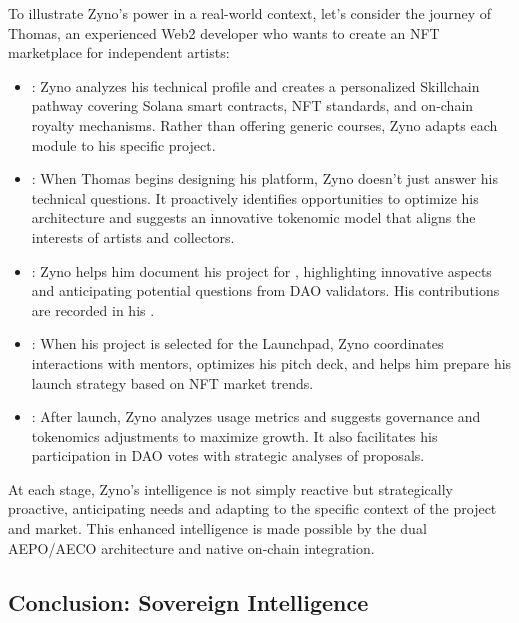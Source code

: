 To illustrate Zyno's power in a real-world context, let's consider the journey of Thomas, an experienced Web2 developer who wants to create an NFT marketplace for independent artists:

\begin{itemize}
    \item {}: Zyno analyzes his technical profile and creates a personalized Skillchain pathway covering Solana smart contracts, NFT standards, and on-chain royalty mechanisms. Rather than offering generic courses, Zyno adapts each module to his specific project.
    
    \item {}: When Thomas begins designing his platform, Zyno doesn't just answer his technical questions. It proactively identifies opportunities to optimize his architecture and suggests an innovative tokenomic model that aligns the interests of artists and collectors.
    
    \item {}: Zyno helps him document his project for , highlighting innovative aspects and anticipating potential questions from DAO validators. His contributions are recorded in his .
    
    \item {}: When his project is selected for the Launchpad, Zyno coordinates interactions with mentors, optimizes his pitch deck, and helps him prepare his launch strategy based on NFT market trends.
    
    \item {}: After launch, Zyno analyzes usage metrics and suggests governance and tokenomics adjustments to maximize growth. It also facilitates his participation in DAO votes with strategic analyses of proposals.
\end{itemize}

At each stage, Zyno's intelligence is not simply reactive but strategically proactive, anticipating needs and adapting to the specific context of the project and market. This enhanced intelligence is made possible by the dual AEPO/AECO architecture and native on-chain integration.

\subsection{Conclusion: Sovereign Intelligence}

